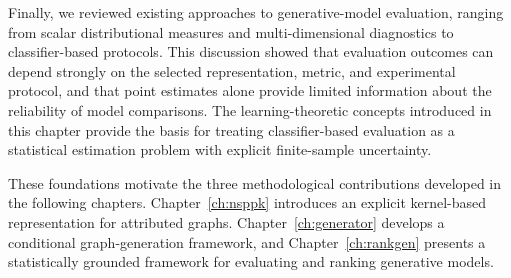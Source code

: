 Finally, we reviewed existing approaches to generative-model evaluation,
ranging from scalar distributional measures and multi-dimensional diagnostics
to class\-ifier-based protocols. This discussion showed that evaluation outcomes
can depend strongly on the selected representation, metric, and experimental
protocol, and that point estimates alone provide limited information about the
reliability of model comparisons. The learning-theoretic concepts introduced
in this chapter provide the basis for treating classifier-based evaluation as
a statistical estimation problem with explicit finite-sample uncertainty.

These foundations motivate the three methodological contributions developed in
the following chapters. Chapter~\ref{ch:nsppk} introduces an explicit
kernel-based representation for attributed graphs.
Chapter~\ref{ch:generator} develops a conditional graph-generation framework,
and Chapter~\ref{ch:rankgen} presents a statistically grounded framework for
evaluating and ranking generative models.
